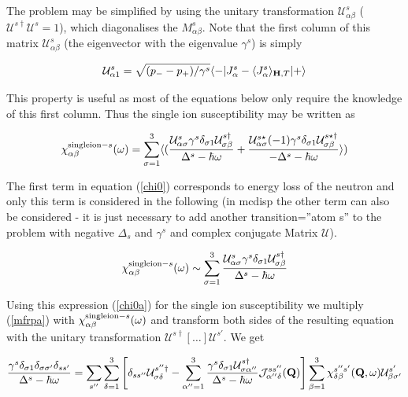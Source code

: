 The  problem  may be simplified by using
the unitary transformation ${\mathcal U^s_{\alpha\beta}}$ (${\mathcal U^{s\dag}\mathcal U^s}=1$), which diagonalises the %
$M^s_{\alpha\beta}$. Note that the first column of this matrix ${\mathcal U^s_{\alpha\beta}}$ (the eigenvector with the %
eigenvalue $\gamma^s$) is simply 

\begin{equation}\label{ufirstrow}
{\mathcal U^s_{\alpha1}}=\sqrt{(p_--p_+)/\gamma^s}\langle -|J^s_{\alpha}-\langle J^s_{\alpha}\rangle_{\mathbf H,T}|+\rangle
\end{equation}

 This property is useful as most of the equations below only require the knowledge of this first column.
 Thus the single ion susceptibility may be written as

\begin{equation}\label{chi0}
\chi^{{\rm single ion-} s}_{\alpha\beta}(\omega)=\sum_{\sigma=1}^3
\langle (
\frac{\mathcal U^{s}_{\alpha\sigma}\gamma^s\delta_{\sigma 1}\mathcal U^{s\dag}_{\sigma\beta}}{\Delta^s-\hbar \omega}+
\frac{\mathcal U^{s\star}_{\alpha\sigma}(-1)\gamma^s\delta_{\sigma 1}\mathcal %
U^{s\star\dag}_{\sigma\beta}}{-\Delta^s-\hbar \omega}
\rangle )
\end{equation}

The first term in equation (\ref{chi0}) corresponds to energy loss of the neutron and only this term is considered in
the following (in {\prg mcdisp} the other term can also be considered - it is just
necessary to add another transition=''atom s'' to the problem with negative $\Delta_s$
and $\gamma^s$ and complex conjugate Matrix $\mathcal U$).

\begin{equation}\label{chi0a}
\chi^{{\rm single ion-} s}_{\alpha\beta}(\omega) \sim \sum_{\sigma=1}^3
\frac{\mathcal U^{s}_{\alpha\sigma}\gamma^s\delta_{\sigma 1}\mathcal U^{s\dag}_{\sigma\beta}}{\Delta^s-\hbar \omega}
\end{equation}

Using this expression (\ref{chi0a}) for the single ion susceptibility we multiply (\ref{mfrpa}) with 
$\chi^{{\rm single ion-} s}_{\alpha\beta}(\omega)$ and transform both sides of the resulting equation
with the unitary transformation ${\mathcal U}^{s\dag}[\dots]\mathcal U^{s'}$. We get

\begin{equation}\label{utransform}
\frac{\gamma^s \delta_{\sigma1} \delta_{\sigma\sigma'} \delta_{ss'}}{\Delta^s-\hbar\omega}
=
\sum_{s''}\sum_{\delta=1}^3
\left[\delta_{ss''}\mathcal U^{s''\dag}_{\sigma\delta}- \sum_{\alpha''=1}^3
\frac{\gamma^s\delta_{\sigma1} \mathcal U^{s\dag}_{\sigma\alpha''}}{\Delta^s-\hbar\omega}\mathcal %
J^{ss''}_{\alpha''\delta}(\mbf Q) \right] 
\sum_{\beta=1}^{3}
\chi_{\delta\beta}^{s''s'}({\mbf Q},\omega) \mathcal U^{s'}_{\beta\sigma'}
\end{equation}

